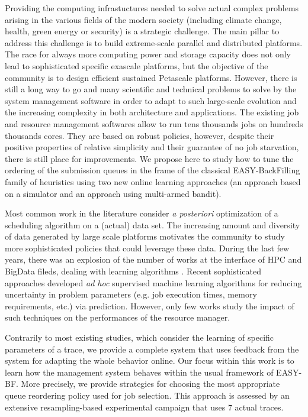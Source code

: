 \documentclass[sigconf]{acmart}
\begin{document}
Providing the computing infrastuctures needed to solve actual complex problems
arising in the various fields of the modern society (including climate change,
health, green energy or security) is a strategic challenge.  The main pillar to
address this challenge is to build extreme-scale parallel and distributed
platforms.  The race for always more computing power and storage capacity does
not only lead to sophisticated specific exascale platforms, but the objective
of the community is to design efficient sustained Petascale platforms.
However, there is still a long way to go and many scientific and technical
problems to solve by the system management software in order to adapt to such
large-scale evolution and the increasing complexity in both architecture and
applications.  The existing job and resource management softwares allow to run
tens thousands jobs on hundreds thousands cores.  They are based on robust
policies, however, despite their positive properties of relative simplicity and
their guarantee of no job starvation, there is still place for improvements.
We propose here to study how to tune the ordering of the submission queues in
the frame of the classical EASY-BackFilling family of heuristics using two new
online learning approaches (an approach based on a simulator and an approach
using multi-armed bandit).

Most common work in the literature consider \textit{a posteriori} optimization
of a scheduling algorithm on a (actual) data set.  The increasing amount and
diversity of data generated by large scale platforms motivates the community to
study more sophisticated policies that could leverage these data.  During the
last few years, there was an explosion of the number of works at the interface
of HPC and BigData fileds, dealing with learning algorithms .  Recent
sophisticated approaches developed \textit{ad hoc} supervised machine learning
algorithms for reducing uncertainty in problem parameters (e.g. job execution
times, memory requirements, etc.) via prediction.  However, only few works
study the impact of such techniques on the performances of the resource
manager.

Contrarily to most existing studies, which consider the learning of specific
parameters of a trace, we provide a complete system that uses feedback from the
system for adapting the whole behavior online.  Our focus within this work is
to learn how the management system behaves within the usual framework of
EASY-BF.  More precisely, we provide strategies for choosing the most
appropriate queue reordering policy used for job selection.  This approach is
assessed by an extensive resampling-based experimental campaign that uses 7
actual traces.
\end{document}
